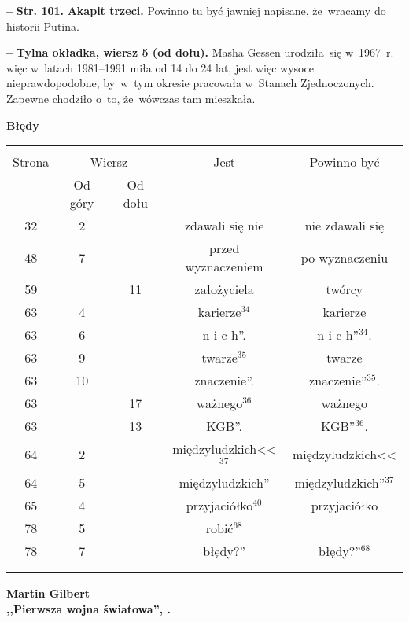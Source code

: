 \documentclass[a4paper,11pt]{article}
\newcommand{\spaceOne}{2em}
\newcommand{\tb}{\textbf}
\newcommand{\noi}{\noindent}
\newcommand{\start}{\noi \tb{--} {}}
\newcommand{\Center}[1]{\begin{center} #1 \end{center}}
\newcommand{\CenterTB}[1]{\Center{\tb{#1}}}
\newcommand{\Str}[1]{\tb{Str. #1.}}
\newcommand{\Work}[1]{ \begin{center} {\large \tb{#1}} \end{center} }
\begin{document}
\start \Str{101} \tb{Akapit trzeci.} Powinno tu być jawniej napisane,
że~wracamy do historii Putina.

\start \tb{Tylna okładka, wiersz 5 (od dołu).} Masha Gessen
urodziła~się w~1967~r. więc w~latach 1981--1991 miła od 14 do 24 lat,
jest więc wysoce nieprawdopodobne, by~w~tym okresie pracowała
w~Stanach Zjednoczonych. Zapewne chodziło o~to, że~wówczas tam
mieszkała.


\CenterTB{Błędy}
\begin{center}
  \begin{tabular}{|c|c|c|c|c|}
    \hline
    & \multicolumn{2}{c|}{} & & \\
    Strona & \multicolumn{2}{c|}{Wiersz}& Jest & Powinno być \\ \cline{2-3}
    & Od góry & Od dołu &  &  \\ \hline
    32 & 2 & & zdawali się nie & nie zdawali się \\
    48 & 7 & & przed wyznaczeniem & po wyznaczeniu \\
    59 & & 11 & założyciela & twórcy \\
    63 & 4 & & karierze$^{ 34 }$ & karierze \\
    63 & 6 & & n i c h''. & n i c h''$^{ 34 }$. \\
    63 & 9 & & twarze$^{ 35 }$ & twarze \\
    63 & 10 & & znaczenie''. & znaczenie''$^{ 35 }$. \\
    63 & & 17 & ważnego$^{ 36 }$ & ważnego \\
    63 & & 13 & KGB''. & KGB''$^{ 36 }$. \\
    64 & 2 & & międzyludzkich<<$^{ 37 }$ & międzyludzkich<< \\
    64 & 5 & & międzyludzkich'' & międzyludzkich''$^{ 37 }$ \\
    65 & 4 & & przyjaciółko$^{ 40 }$ & przyjaciółko \\
    78 & 5 & & robić$^{ 68 }$ & \\
    78 & 7 & & błędy?'' & błędy?''$^{ 68 }$ \\
    & & & & \\
    & & & & \\ \hline
  \end{tabular}
\end{center}

\vspace{\spaceOne}



\Work{
  Martin Gilbert \\
  ,,Pierwsza wojna światowa'', \cite{Gil03}.}
\end{document}

